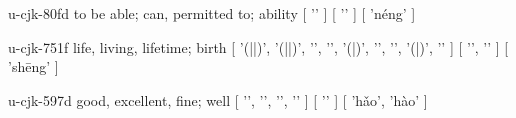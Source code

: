 \begin{multicols}{2}
\lettrine[lines=3]{\cjkgGlue{}}{}\begin{minipage}{0.8\linewidth} u-cjk-80fd  to be able; can, permitted to; ability  [ '\cjkgGlue{}' ]  [ '\cjkgGlue{}' ]  [ 'néng' ] \end{minipage}

\lettrine[lines=3]{\cjkgGlue{}}{}\begin{minipage}{0.8\linewidth} u-cjk-751f  life, living, lifetime; birth  [ '\cjkgGlue{}(\cjkgGlue{}|\cjkgGlue{}|\cjkgGlue{})',
  '\cjkgGlue{}(\cjkgGlue{}|\cjkgGlue{}|\cjkgGlue{})',
  '\cjkgGlue{}',
  '\cjkgGlue{}',
  '\cjkgGlue{}(\cjkgGlue{}|\cjkgGlue{})',
  '\cjkgGlue{}',
  '\cjkgGlue{}',
  '\cjkgGlue{}(\cjkgGlue{}|\cjkgGlue{})',
  '\cjkgGlue{}' ]  [ '\cjkgGlue{}', '\cjkgGlue{}' ]  [ 'shēng' ] \end{minipage}

\lettrine[lines=3]{\cjkgGlue{}}{}\begin{minipage}{0.8\linewidth} u-cjk-597d  good, excellent, fine; well  [ '\cjkgGlue{}', '\cjkgGlue{}', '\cjkgGlue{}', '\cjkgGlue{}' ]  [ '\cjkgGlue{}' ]  [ 'hǎo', 'hào' ] \end{minipage}


\end{multicols}
